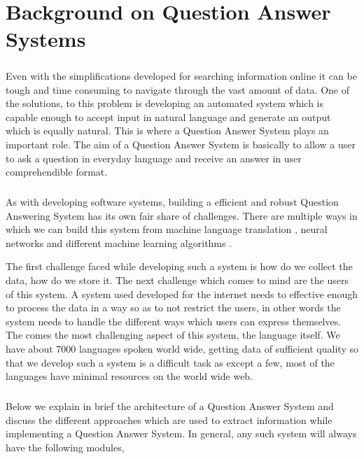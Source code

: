\chapter{Background on Question Answer Systems}

\paragraph{}
Even with the simplifications developed for searching information online it can be tough and time consuming to navigate through the vast amount of data. One of the solutions, to this problem is developing an automated system which is capable enough to accept input in natural language and generate an output which is equally natural. This is where a Question Answer System plays an important role. The aim of a Question Answer System is basically to allow a user to ask a question in everyday language and receive an answer in user comprehendible format. 

\paragraph{}
As with developing software systems, building a efficient and robust Question Answering System has its own fair share of challenges. There are multiple ways in which we can build this system from  machine language translation \cite {bao2014knowledge}, neural networks \cite{iyyer2014neural} and different machine learning algorithms \cite{zhang2003question}.

The first challenge faced while developing such a system is how do we collect the data, how do we store it. The next challenge which comes to mind are the users of this system. A system used developed for the internet needs to effective enough to process the data in a way so as to not restrict the users, in other words the system needs to handle the different ways which users can express themselves. The comes the most challenging aspect of this system, the language itself. We have about 7000 languages spoken world wide, getting data of sufficient quality so that we develop such a system is a difficult task as except a few, most of the languages have minimal resources on the world wide web.
 
\paragraph{}
Below we explain in brief the architecture of a Question Answer System and discuss the different approaches which are used to extract information while implementing a Question Answer System. In general, any such system will always have the following modules,

